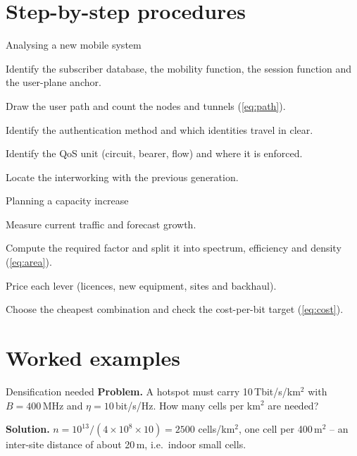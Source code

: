 \documentclass[11pt,a4paper]{article}
\begin{document}
\section{Step-by-step procedures}

\begin{procedurebox}{Analysing a new mobile system}\label{proc:analyse}
\begin{steps}
  \item Identify the subscriber database, the mobility function, the session function and the user-plane anchor.
  \item Draw the user path and count the nodes and tunnels (\cref{eq:path}).
  \item Identify the authentication method and which identities travel in clear.
  \item Identify the QoS unit (circuit, bearer, flow) and where it is enforced.
  \item Locate the interworking with the previous generation.
\end{steps}
\end{procedurebox}

\begin{procedurebox}{Planning a capacity increase}\label{proc:cap}
\begin{steps}
  \item Measure current traffic and forecast growth.
  \item Compute the required factor and split it into spectrum, efficiency and density (\cref{eq:area}).
  \item Price each lever (licences, new equipment, sites and backhaul).
  \item Choose the cheapest combination and check the cost-per-bit target (\cref{eq:cost}).
\end{steps}
\end{procedurebox}

\section{Worked examples}

\begin{examplebox}{Densification needed}\label{ex:dens}
\textbf{Problem.} A hotspot must carry 10\,Tbit/s/km$^2$ with $B = 400$\,MHz and $\eta = 10$\,bit/s/Hz. How many cells per km$^2$ are needed?

\textbf{Solution.} $n = 10^{13}/(4\times10^{8}\times10) = 2500$ cells/km$^2$, one cell per 400\,m$^2$ -- an inter-site distance of about 20\,m, i.e.\ indoor
small cells.
\end{examplebox}
\end{document}
